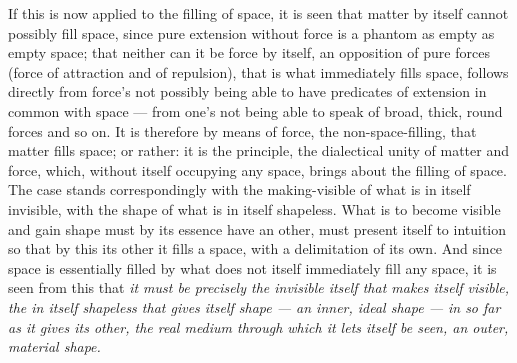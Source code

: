 \documentclass[12pt,a4paper]{book}
\begin{document}
If this is now applied to the filling of space, it is seen that matter by
itself cannot possibly fill space, since pure extension without force is a
phantom as empty as empty space; that neither can it be force by itself, an
opposition of pure forces (force of attraction and of repulsion), that is what
immediately fills space, follows directly from force's not possibly being able
to have predicates of extension in common with space --- from one's not being
able to speak of broad, thick, round forces and so on. It is therefore by means
of force, the non-space-filling, that matter fills space; or rather: it is the
principle, the dialectical unity of matter and force, which, without itself
occupying any space, brings about the filling of space. The case stands
correspondingly with the making-visible of what is in itself invisible, with
the shape of what is in itself shapeless. What is to become visible and gain
shape must by its essence have an other, must present itself to intuition so
that by this its other it fills a space, with a delimitation of its own. And
since space is essentially filled by what does not itself immediately fill any
space, it is seen from this that \emph{it must be precisely the invisible
itself that makes itself visible, the in itself shapeless that gives itself
shape --- an inner, ideal shape --- in so far as it gives its other, the real
medium through which it lets itself be seen, an outer, material shape.}
\end{document}

